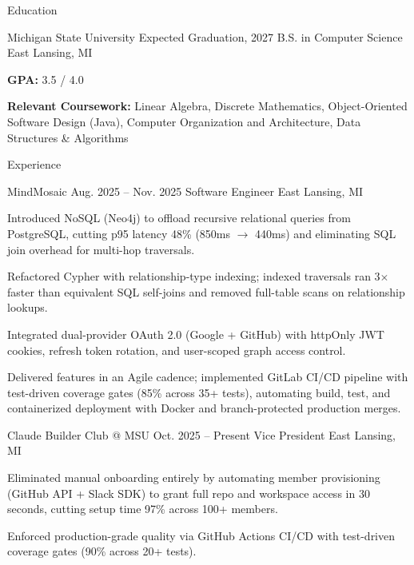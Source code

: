 \documentclass[
	11pt
]{../../../resume}
\begin{document}
	\begin{rSection}{E}{ducation}
		\begin{rSectionEntry}
			{Michigan State University}
			{Expected Graduation, 2027}
			{B.S. in Computer Science}
			{}
			{East Lansing, MI}

			\item \textbf{GPA:} 3.5 / 4.0
			\item \textbf{Relevant Coursework:} Linear Algebra, Discrete Mathematics, Object-Oriented Software Design (Java), Computer Organization and Architecture, Data Structures \& Algorithms
		\end{rSectionEntry}
	\end{rSection}

	\begin{rSection}{E}{xperience}
		\begin{rSectionEntry}
			{MindMosaic}
			{Aug. 2025 -- Nov. 2025}
			{Software Engineer}
			{}
			{East Lansing, MI}

			\item Introduced NoSQL (Neo4j) to offload recursive relational queries from PostgreSQL, cutting p95 latency 48\% (850ms $\rightarrow$ 440ms) and eliminating SQL join overhead for multi-hop traversals.
			\item Refactored Cypher with relationship-type indexing; indexed traversals ran 3$\times$ faster than equivalent SQL self-joins and removed full-table scans on relationship lookups.
			\item Integrated dual-provider OAuth 2.0 (Google + GitHub) with httpOnly JWT cookies, refresh token rotation, and user-scoped graph access control.
			\item Delivered features in an Agile cadence; implemented GitLab CI/CD pipeline with test-driven coverage gates (85\% across 35+ tests), automating build, test, and containerized deployment with Docker and branch-protected production merges.
		\end{rSectionEntry}

		\begin{rSectionEntry}
			{Claude Builder Club @ MSU}
			{Oct. 2025 -- Present}
			{Vice President}
			{}
			{East Lansing, MI}

			\item Eliminated manual onboarding entirely by automating member provisioning (GitHub API + Slack SDK) to grant full repo and workspace access in 30 seconds, cutting setup time 97\% across 100+ members.
			\item Enforced production-grade quality via GitHub Actions CI/CD with test-driven coverage gates (90\% across 20+ tests).
		\end{rSectionEntry}
	\end{rSection}
\end{document}
